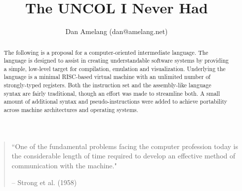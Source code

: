 \documentclass[10pt]{article}
\begin{document}
\twocolumn

\title{The UNCOL I Never Had}
\author{Dan Amelang (dan@amelang.net)}
\maketitle

\begin{quotation}\small
``One of the fundamental problems facing the computer profession today is the considerable
length of time required to develop an effective method of communication with the machine."

-- Strong et al. (1958)
\end{quotation}

\begin{abstract}

The following is a proposal for a computer-oriented intermediate language.
The language is designed to assist in creating understandable
software systems by providing a simple, low-level target for
compilation, emulation and visualization.
Underlying the language is a
minimal RISC-based virtual machine with an unlimited number of strongly-typed registers.
Both the instruction set and the assembly-like language syntax are fairly
traditional, though an effort was made to streamline both.
A small amount of additional syntax and pseudo-instructions were added to achieve
portability across machine architectures and operating systems.

\end{abstract}






%



\end{document}

